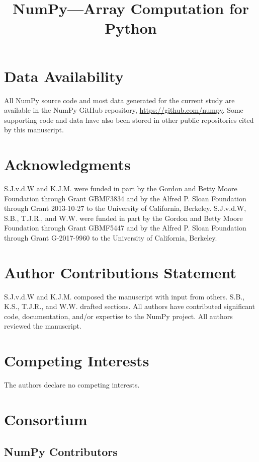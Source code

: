 \documentclass[fleqn,10pt]{wlscirep}
\title{NumPy---Array Computation for Python}
\begin{document}
\flushbottom
\maketitle
\thispagestyle{empty}





\section*{Data Availability}

All NumPy source code and most data generated for the current study are
available in the NumPy GitHub repository, \url{https://github.com/numpy}. Some
supporting code and data have also been stored in other public repositories
cited by this manuscript.



\section*{Acknowledgments}

S.J.v.d.W and K.J.M. were funded in part by the Gordon and Betty Moore
Foundation through Grant GBMF3834 and by the Alfred P. Sloan Foundation through
Grant 2013-10-27 to the University of California, Berkeley.
S.J.v.d.W, S.B., T.J.R., and W.W. were funded in part by the Gordon
and Betty Moore Foundation through Grant GBMF5447 and by the Alfred
P. Sloan Foundation through Grant G-2017-9960 to the University of
California, Berkeley.


\section*{Author Contributions Statement}

S.J.v.d.W and K.J.M. composed the manuscript with input from others.
S.B., K.S., T.J.R., and W.W. drafted sections.
All authors have contributed significant code, documentation, and/or expertise
to the NumPy project.
All authors reviewed the manuscript.

\section*{Competing Interests}

The authors declare no competing interests.

\section*{Consortium}
\subsection*{NumPy Contributors}

\end{document}
